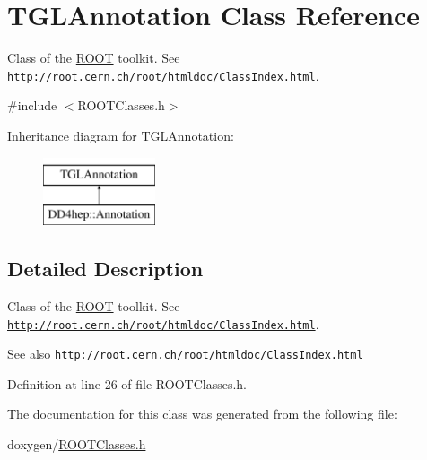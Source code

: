 \hypertarget{class_t_g_l_annotation}{}\section{T\+G\+L\+Annotation Class Reference}
\label{class_t_g_l_annotation}


Class of the \hyperlink{namespace_r_o_o_t}{R\+O\+OT} toolkit. See \href{http://root.cern.ch/root/htmldoc/ClassIndex.html}{\tt http\+://root.\+cern.\+ch/root/htmldoc/\+Class\+Index.\+html}.  




{\ttfamily \#include $<$R\+O\+O\+T\+Classes.\+h$>$}

Inheritance diagram for T\+G\+L\+Annotation\+:\begin{figure}[H]
\begin{center}
\leavevmode
\includegraphics[height=2.000000cm]{class_t_g_l_annotation}
\end{center}
\end{figure}


\subsection{Detailed Description}
Class of the \hyperlink{namespace_r_o_o_t}{R\+O\+OT} toolkit. See \href{http://root.cern.ch/root/htmldoc/ClassIndex.html}{\tt http\+://root.\+cern.\+ch/root/htmldoc/\+Class\+Index.\+html}. 

\begin{DoxySeeAlso}{See also}
\href{http://root.cern.ch/root/htmldoc/ClassIndex.html}{\tt http\+://root.\+cern.\+ch/root/htmldoc/\+Class\+Index.\+html} 
\end{DoxySeeAlso}


Definition at line 26 of file R\+O\+O\+T\+Classes.\+h.



The documentation for this class was generated from the following file\+:\begin{DoxyCompactItemize}
\item 
doxygen/\hyperlink{_r_o_o_t_classes_8h}{R\+O\+O\+T\+Classes.\+h}\end{DoxyCompactItemize}
